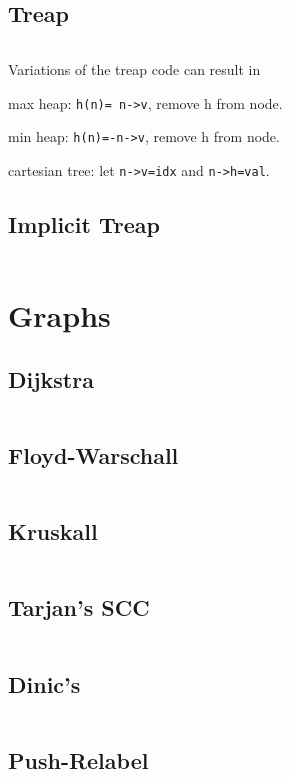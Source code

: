 \documentclass[11pt, a4paper]{amsart}
\newenvironment{itemize_compact}
{ \begin{itemize}[leftmargin=.5cm]
    \setlength{\itemsep}{0pt}
    \setlength{\parskip}{0pt}
    \setlength{\parsep}{0pt}     }
{ \end{itemize}                  }
\begin{document}
	\begin{multicols*}{2}
		\subsection{Treap}
		\inputminted[firstline=16,lastline=65]{c++}{.code/datastructures/treap.cpp}
		\noindent
		Variations of the treap code can result in
		\begin{itemize_compact}
			\item max heap: \texttt{h(n)= n->v}, remove h from node.
			\item min heap: \texttt{h(n)=-n->v}, remove h from node.
			\item cartesian tree: let \texttt{n->v=idx} and \texttt{n->h=val}.
		\end{itemize_compact}
		\vfill\null
		\columnbreak
		\subsection{Implicit Treap}
		\inputminted[firstline=16,lastline=56]{c++}{.code/datastructures/implicit_treap.cpp}
		\vfill\null
	\end{multicols*}
	\section{Graphs}
	\begin{multicols*}{2}
		\subsection{Dijkstra}
		\inputminted[firstline=21,lastline=28]{c++}{.code/graphs/dijkstra.cpp}
		\subsection{Floyd-Warschall}
		\inputminted[firstline=17,lastline=21]{c++}{.code/graphs/floyd_warschall.cpp}
		\subsection{Kruskall}
		\inputminted[firstline=27,lastline=36]{c++}{.code/graphs/kruskall.cpp}
		\subsection{Tarjan's SCC}
		\inputminted[firstline=27,lastline=39]{c++}{.code/graphs/scc.cpp}
		\vfill\null
		\columnbreak
		\subsection{Dinic's}
		\inputminted[firstline=12,lastline=27]{c++}{.code/graphs/dinic.cpp}
		\subsection{Push-Relabel}
		\inputminted[firstline=12,lastline=26]{c++}{.code/graphs/pushrelabel.cpp}
		\vfill\null
	\end{multicols*}
	\newpage
\end{document}
